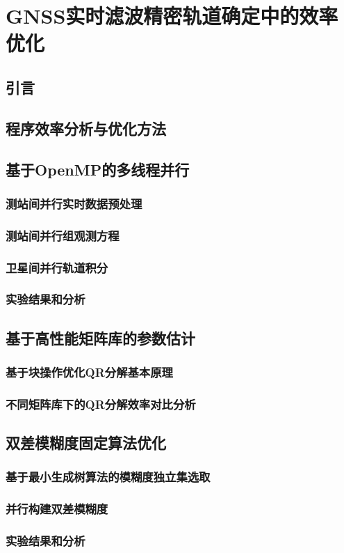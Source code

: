
\chapter{GNSS实时滤波精密轨道确定中的效率优化}

\section{引言}

\section{程序效率分析与优化方法}

\section{基于OpenMP的多线程并行}

\subsection{测站间并行实时数据预处理}

\subsection{测站间并行组观测方程}

\subsection{卫星间并行轨道积分}

\subsection{实验结果和分析}

\section{基于高性能矩阵库的参数估计}

\subsection{基于块操作优化QR分解基本原理}

\subsection{不同矩阵库下的QR分解效率对比分析}

\section{双差模糊度固定算法优化}

\subsection{基于最小生成树算法的模糊度独立集选取}

\subsection{并行构建双差模糊度}

\subsection{实验结果和分析}
